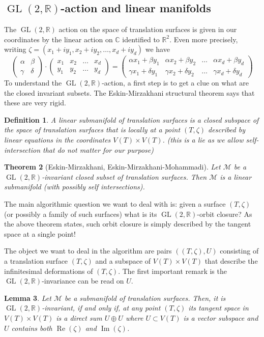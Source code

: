 \documentclass[a4paper,12pt]{article}
\def\bC{\mathbb{C}}
\def\bR{\mathbb{R}}
\def\cM{\mathcal{M}}
\def\Re{\operatorname{Re}}
\def\Im{\operatorname{Im}}
\def\GL{\operatorname{GL}}
\newtheorem{definition}{Definition}
\newtheorem{lemma}[definition]{Lemma}
\newtheorem{theorem}[definition]{Theorem}
\begin{document}
\subsection{$\GL(2,\bR)$-action and linear manifolds}
The $\GL(2,\bR)$ action on the space of translation surfaces is given in our
coordinates by the linear action on $\bC$ identified to $\bR^2$. Even more
precisely, writing $\zeta = (x_1 + i y_1, x_2 + i y_2, \ldots, x_d + i y_d)$ we have
\[
\begin{pmatrix}
\alpha & \beta \\
\gamma & \delta
\end{pmatrix}
\cdot
\begin{pmatrix}
x_1 & x_2 & \ldots & x_d \\
y_1 & y_2 & \ldots & y_d
\end{pmatrix}
=
\begin{pmatrix}
\alpha x_1 + \beta y_1 & \alpha x_2 + \beta y_2 & \ldots & \alpha x_d + \beta y_d \\
\gamma x_1 + \delta y_1 & \gamma x_2 + \delta y_2 & \ldots & \gamma x_d + \delta y_d
\end{pmatrix}
\]
To understand the $\GL(2,\bR)$-action, a first step is to get a clue on what
are the closed invariant subsets. The Eskin-Mirzakhani structural theorem
says that these are very rigid.
\begin{definition}
A \emph{linear submanifold} of translation surfaces is a closed subspace of the
space of translation surfaces that is locally at a point $(T, \zeta)$ described
by linear equations in the coordinates $V(T) \times V(T)$.
(this is a lie as we allow self-intersection that do not matter for our purpose)
\end{definition}

\begin{theorem}[Eskin-Mirzakhani, Eskin-Mirzakhani-Mohammadi]
Let $\cM$ be a $\GL(2,\bR)$-invariant closed subset of translation surfaces. Then
$\cM$ is a linear submanifold (with possibly self intersections).
\end{theorem}

The main algorithmic question we want to deal with is: given a surface $(T, \zeta)$
(or possibly a family of such surfaces) what is its $\GL(2,\bR)$-orbit closure? As the
above theorem states, such orbit closure is simply described by the tangent space
at a single point!

The object we want to deal in the algorithm are pairs $((T,\zeta), U)$
consisting of a translation surface $(T,\zeta)$ and a subspace of $V(T) \times
V(T)$ that describe the infinitesimal deformations of $(T, \zeta)$.
The first important remark is the $\GL(2,\bR)$-invariance can be read on $U$.
\begin{lemma}
Let $\cM$ be a submanifold of translation surfaces. Then, it is
$\GL(2,\bR)$-invariant, if and only if, at any point $(T, \zeta)$ its tangent
space in $V(T) \times V(T)$ is a direct sum $U \oplus U$ where $U \subset V(T)$
is a vector subspace and $U$ contains both $\Re(\zeta)$ and $\Im(\zeta)$.
\end{lemma}
\end{document}
